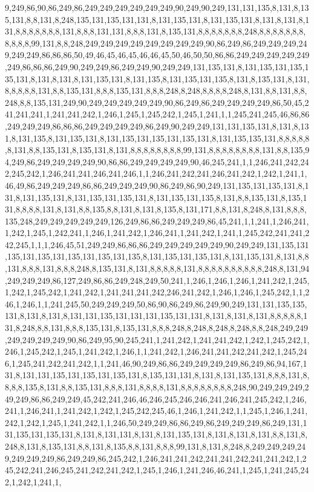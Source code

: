 9,249,86,90,86,249,86,249,249,249,249,249,249,90,249,90,249,131,131,135,8,131,8,135,131,8,8,131,8,248,135,131,135,131,131,8,131,135,131,8,131,135,131,8,131,8,131,8,131,8,8,8,8,8,8,8,131,8,8,8,131,131,8,8,8,131,8,135,131,8,8,8,8,8,8,8,248,8,8,8,8,8,8,8,8,8,8,8,99,131,8,8,248,249,249,249,249,249,249,249,249,90,86,249,86,249,249,249,249,249,249,86,86,86,50,49,46,45,46,45,46,46,45,50,46,50,50,86,86,249,249,249,249,249,249,86,86,86,249,90,249,249,86,249,249,90,249,249,131,135,131,8,131,135,131,135,135,131,8,131,8,131,8,131,135,131,8,131,135,8,131,135,131,135,8,131,8,135,131,8,131,8,8,8,8,8,131,8,8,135,131,8,8,8,135,131,8,8,8,248,8,248,8,8,8,8,248,8,131,8,8,131,8,8,248,8,8,135,131,249,90,249,249,249,249,249,90,86,249,86,249,249,249,249,86,50,45,241,241,241,1,241,241,242,1,246,1,245,1,245,242,1,245,1,241,1,1,245,241,245,46,86,86,249,249,249,86,86,86,249,249,249,249,86,249,90,249,249,131,131,135,131,8,131,8,131,8,131,135,8,131,135,131,8,131,135,131,135,131,135,131,8,131,135,135,131,8,8,8,8,8,8,131,8,8,135,131,8,135,131,8,131,8,8,8,8,8,8,8,8,99,131,8,8,8,8,8,8,8,8,131,8,8,135,94,249,86,249,249,249,249,90,86,86,249,249,249,249,90,46,245,241,1,1,246,241,242,242,245,242,1,246,241,241,246,241,246,1,1,246,241,242,241,246,241,242,1,242,1,241,1,46,49,86,249,249,249,86,86,249,249,249,90,86,249,86,90,249,131,135,131,135,131,8,131,8,131,135,131,8,131,135,131,135,131,8,131,135,131,135,8,131,8,8,135,131,8,135,131,8,8,8,8,131,8,131,8,8,135,8,8,131,8,131,8,135,8,131,171,8,8,131,8,248,8,131,8,8,8,135,248,249,249,249,249,249,126,249,86,86,249,249,249,86,45,241,1,1,241,1,246,241,1,242,1,245,1,242,241,1,246,1,241,242,1,246,241,1,241,242,1,241,1,245,242,241,241,242,245,1,1,1,246,45,51,249,249,86,86,86,249,249,249,249,249,90,249,249,131,135,131,135,131,135,131,135,131,135,131,135,8,131,135,131,135,131,8,131,135,131,8,131,8,8,131,8,8,8,131,8,8,8,248,8,135,131,8,131,8,8,8,8,8,131,8,8,8,8,8,8,8,8,8,8,248,8,131,94,249,249,249,86,127,249,86,86,249,248,249,50,241,1,246,1,246,1,246,1,241,242,1,245,1,242,1,245,242,1,241,242,1,241,241,241,242,246,241,242,1,246,1,246,1,245,242,1,1,246,1,246,1,1,241,245,50,249,249,249,50,86,90,86,249,86,249,90,249,131,131,135,135,131,8,131,8,131,8,131,131,135,131,131,131,135,131,131,8,131,8,131,8,131,8,8,8,8,8,131,8,248,8,8,131,8,8,8,135,131,8,135,131,8,8,8,248,8,248,8,248,8,248,8,8,248,249,249,249,249,249,249,90,86,249,95,90,245,241,1,241,242,1,241,241,242,1,242,1,245,242,1,246,1,245,242,1,245,1,241,242,1,246,1,1,241,242,1,246,241,241,242,241,242,1,245,246,1,245,241,242,241,242,1,1,241,46,90,249,86,86,249,249,249,249,86,249,86,94,167,131,8,131,131,135,131,135,131,135,131,8,135,131,131,8,131,8,131,135,131,8,8,8,131,8,8,8,8,135,8,131,8,8,135,131,8,8,8,131,8,8,8,8,131,8,8,8,8,8,8,8,8,248,90,249,249,249,249,249,86,86,249,249,45,242,241,246,46,246,245,246,246,241,246,241,245,242,1,246,241,1,246,241,1,241,242,1,242,1,245,242,245,46,1,246,1,241,242,1,1,245,1,246,1,241,242,1,242,1,245,1,241,242,1,1,246,50,249,249,86,86,249,86,249,249,249,86,249,131,131,135,131,135,131,8,131,8,131,131,8,131,8,131,135,131,8,131,8,131,8,131,8,8,131,8,248,8,131,8,135,131,8,8,131,8,135,8,8,131,8,8,8,99,131,8,131,8,248,8,249,249,249,249,249,249,249,86,249,249,86,245,242,1,246,241,241,242,241,241,242,241,241,242,1,245,242,241,246,245,241,242,241,242,1,245,1,246,1,241,246,46,241,1,245,1,241,245,242,1,242,1,241,1,